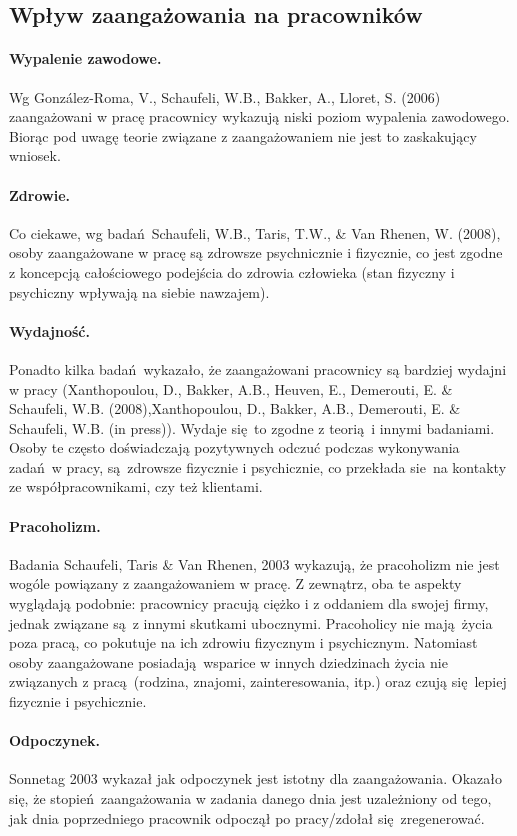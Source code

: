 \subsection{Wpływ zaangażowania na pracowników}
\paragraph{Wypalenie zawodowe.}
Wg González-Roma, V., Schaufeli, W.B., Bakker, A., Lloret, S. (2006) zaangażowani w pracę pracownicy wykazują niski poziom wypalenia zawodowego. Biorąc pod uwagę teorie związane z zaangażowaniem nie jest to zaskakujący wniosek.
\paragraph{Zdrowie.}
Co ciekawe, wg badań Schaufeli, W.B., Taris, T.W., \& Van Rhenen, W. (2008), osoby zaangażowane w pracę są zdrowsze psychnicznie i fizycznie, co jest zgodne z koncepcją całościowego podejścia do zdrowia człowieka (stan fizyczny i psychiczny wpływają na siebie nawzajem).
\paragraph{Wydajność.}
Ponadto kilka badań wykazało, że zaangażowani pracownicy są bardziej wydajni w pracy (Xanthopoulou, D., Bakker, A.B., Heuven, E., Demerouti, E. \& Schaufeli, W.B. (2008),Xanthopoulou, D., Bakker, A.B., Demerouti, E. \& Schaufeli, W.B. (in press)). Wydaje się to zgodne z teorią i innymi badaniami. Osoby te często doświadczają pozytywnych odczuć podczas wykonywania zadań w pracy, są zdrowsze fizycznie i psychicznie, co przekłada sie na kontakty ze współpracownikami, czy też klientami.
\paragraph{Pracoholizm.}
Badania Schaufeli, Taris \& Van Rhenen, 2003 wykazują, że pracoholizm nie jest wogóle powiązany z zaangażowaniem w pracę. Z zewnątrz, oba te aspekty wyglądają podobnie: pracownicy pracują ciężko i z oddaniem dla swojej firmy, jednak związane są z innymi skutkami ubocznymi. Pracoholicy nie mają życia poza pracą, co pokutuje na ich zdrowiu fizycznym i psychicznym. Natomiast osoby zaangażowane posiadają wsparice w innych dziedzinach życia nie związanych z pracą (rodzina,
znajomi, zainteresowania, itp.) oraz czują się lepiej fizycznie i psychicznie.
\paragraph{Odpoczynek.}
Sonnetag 2003 wykazał jak odpoczynek jest istotny dla zaangażowania. Okazało się, że stopień zaangażowania w zadania danego dnia jest uzależniony od tego, jak dnia poprzedniego pracownik odpoczął po pracy/zdołał się zregenerować.
